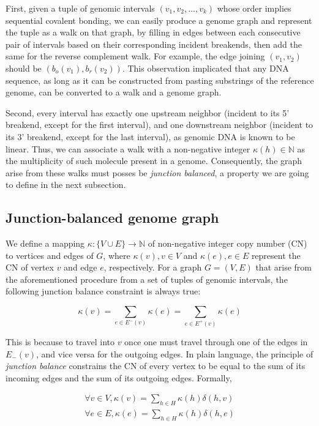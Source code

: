 \documentclass[phd,tocprelim]{cornell}
\begin{document}
First, given a tuple of genomic intervals $(v_1, v_2, \dots, v_k)$ whose order implies sequential covalent bonding, we can easily produce a genome graph and represent the tuple as a walk on that graph, by filling in edges between each consecutive pair of intervals based on their corresponding incident breakends, then add the same for the reverse complement walk. For example, the edge joining $(v_1, v_2)$ should be $(b_o(v_1), b_r(v_2))$. This observation implicated that any DNA sequence, as long as it can be constructed from pasting substrings of the reference genome, can be converted to a walk and a genome graph.

Second, every interval has exactly one upstream neighbor (incident to its 5' breakend, except for the first interval), and one downstream neighbor (incident to its 3' breakend, except for the last interval), as genomic DNA is known to be linear. Thus, we can associate a walk with a non-negative integer $\kappa(h) \in \mathbb{N}$ as the multiplicity of such molecule present in a genome. Consequently, the graph arise from these walks must posses be \textit{junction balanced}, a property we are going to define in  the next subsection.

\subsection{Junction-balanced genome graph} \label{sub:JBGG}
We define a mapping $\kappa:\{V \cup E\}\rightarrow \mathbb{N}$ of non-negative integer copy number (CN) to vertices and edges of $G$, where $\kappa(v),v \in V$ and  $\kappa(e),e \in E$ represent the CN of vertex $v$ and edge $e$, respectively. For a graph $G = (V, E)$ that arise from the aforementioned procedure from a set of tuples of genomic intervals, the following junction balance constraint is always true:

\begin{equation} \label{eq:junction_balance_constraint}
    \kappa(v)= \sum_{e\in E^-(v)} \kappa(e) = \sum_{e\in E^+(v)} \kappa(e)
\end{equation}

This is because to travel into $v$ once one must travel through one of the edges in $E_{-}(v)$, and vice versa for the outgoing edges. In plain language, the principle of \textit{junction balance} constrains the CN of every vertex to be equal to the sum of its incoming edges and the sum of its outgoing edges. Formally,

\begin{equation} \label{eq:sum_of_walk}
    \begin{split}
        \forall v \in V, \kappa(v) = \sum_{h \in H}\kappa(h)\delta(h, v) \\
        \forall e \in E, \kappa(e) = \sum_{h \in H}\kappa(h)\delta(h, e)
    \end{split}
\end{equation}
\end{document}
